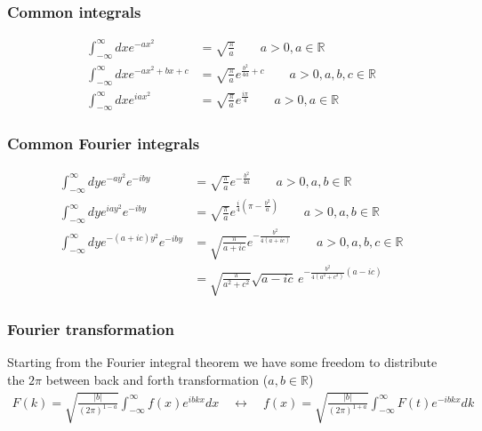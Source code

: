 \documentclass[10pt,a4paper]{article}
\theoremstyle{definition}
\begin{document}
\subsubsection{Common integrals}
\begin{align}
    \int_{-\infty}^\infty dx e^{-ax^2}&=\sqrt{\frac{\pi}{a}} \qquad a>0, a\in\mathbb{R}\\
    \int_{-\infty}^\infty dx e^{-ax^2+bx+c}&=\sqrt{\frac{\pi}{a}}e^{\frac{b^2}{4a}+c} \qquad a>0, a,b,c\in\mathbb{R}\\
    \int_{-\infty}^\infty dx e^{iax^2}&=\sqrt{\frac{\pi}{a}}e^{\frac{i\pi}{4}} \qquad a>0, a\in\mathbb{R}
\end{align}
\subsubsection{Common Fourier integrals}
\begin{align}
    \int_{-\infty}^\infty dy e^{-ay^2}e^{-iby}&=\sqrt{\frac{\pi}{a}}e^{-\frac{b^2}{4a}} \qquad a>0, a,b\in\mathbb{R}\\
    \int_{-\infty}^\infty dy e^{iay^2}e^{-iby}&=\sqrt{\frac{\pi}{a}}e^{\frac{i}{4}\left(\pi-\frac{b^2}{a}\right)} \qquad a>0, a,b\in\mathbb{R}\\
    \int_{-\infty}^\infty dy e^{-(a+ic)y^2}e^{-iby}&=\sqrt{\frac{\pi}{a+ic}}e^{-\frac{b^2}{4(a+ic)}} \qquad a>0, a,b,c\in\mathbb{R}\\
    &=\sqrt{\frac{\pi}{a^2+c^2}}\sqrt{a-ic}\,e^{-\frac{b^2}{4(a^2+c^2)}(a-ic)}
\end{align}

\subsubsection{Fourier transformation}
Starting from the Fourier integral theorem we have some freedom to distribute the $2\pi$ between back and forth transformation ($a,b\in\mathbb{R}$)
\begin{align}
    F(k)=\sqrt{\frac{|b|}{(2\pi)^{1-a}}}\int_{-\infty}^\infty f(x)e^{ibkx}dx\quad\leftrightarrow\quad f(x)=\sqrt{\frac{|b|}{(2\pi)^{1+a}}}\int_{-\infty}^\infty F(t)e^{-ibkx}dk
\end{align}
\end{document}
